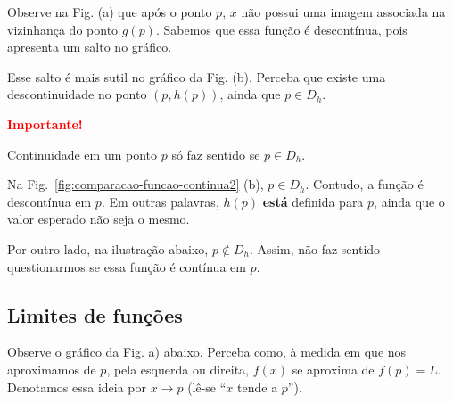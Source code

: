 \documentclass[12pt,openright,twoside,a4paper]{article}
\theoremstyle{definition}
\begin{document}
	Observe na Fig. (a) que após o ponto $p$, $x$ não possui uma imagem associada na vizinhança do ponto $g(p)$. Sabemos que essa função é descontínua, pois apresenta um salto no gráfico.
	
	Esse salto é mais sutil no gráfico da Fig. (b). Perceba que existe uma descontinuidade no ponto $(p,h(p))$, ainda que $p \in D_h$.
	
	\begin{snugshade}
		\textbf{\textcolor{red}{Importante!}}
		
		Continuidade em um ponto $p$ só faz sentido se $p \in D_h$.
		
		Na Fig.~\ref{fig:comparacao-funcao-continua2} (b), $p \in D_h$. Contudo, a função é descontínua em $p$. Em outras palavras, $h(p)$ \textbf{está} definida para $p$, ainda que o valor esperado não seja o mesmo.
		
		Por outro lado, na ilustração abaixo, $p \notin D_h$. Assim, não faz sentido questionarmos se essa função é contínua em $p$.
		
	\begin{center}
	\end{center}
		
	\end{snugshade}
	
		
	
	\subsection{Limites de funções}
	
	Observe o gráfico da Fig. a) abaixo. Perceba como, à medida em que nos aproximamos de $p$, pela esquerda ou direita, $f(x)$ se aproxima de $f(p) = L$. Denotamos essa ideia por $x \to p$ (lê-se ``$x$ tende a $p$'').
	
\end{document}
